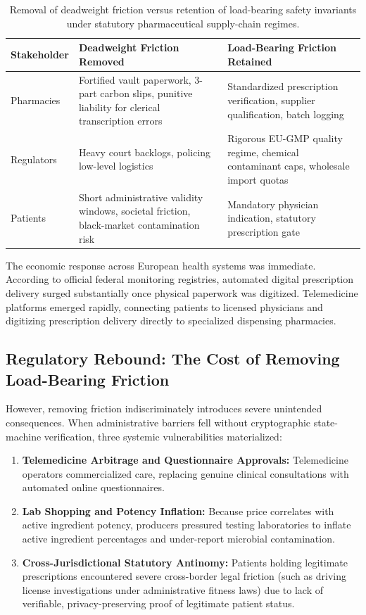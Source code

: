 \documentclass[a4paper,11pt,twoside,parskip=half-,headings=small]{scrartcl}
\begin{document}
\begin{table}[H]
\centering\small
\begin{tabularx}{\linewidth}{@{}l Y Y@{}}
\toprule
\textbf{Stakeholder} & \textbf{Deadweight Friction Removed} & \textbf{Load-Bearing Friction Retained}\\
\midrule
Pharmacies & Fortified vault paperwork, 3-part carbon slips, punitive liability for clerical transcription errors & Standardized prescription verification, supplier qualification, batch logging\\
Regulators & Heavy court backlogs, policing low-level logistics & Rigorous EU-GMP quality regime, chemical contaminant caps, wholesale import quotas\\
Patients & Short administrative validity windows, societal friction, black-market contamination risk & Mandatory physician indication, statutory prescription gate\\
\bottomrule
\end{tabularx}
\caption{Removal of deadweight friction versus retention of load-bearing safety invariants under statutory pharmaceutical supply-chain regimes.}
\label{tab:compliance_friction}
\end{table}

The economic response across European health systems was immediate. According to official federal monitoring registries, automated digital prescription delivery surged substantially once physical paperwork was digitized. Telemedicine platforms emerged rapidly, connecting patients to licensed physicians and digitizing prescription delivery directly to specialized dispensing pharmacies.

\subsection{Regulatory Rebound: The Cost of Removing Load-Bearing Friction}

However, removing friction indiscriminately introduces severe unintended consequences. When administrative barriers fell without cryptographic state-machine verification, three systemic vulnerabilities materialized:
\begin{enumerate}[nosep]
  \item \textbf{Telemedicine Arbitrage and Questionnaire Approvals:} Telemedicine operators commercialized care, replacing genuine clinical consultations with automated online questionnaires.
  \item \textbf{Lab Shopping and Potency Inflation:} Because price correlates with active ingredient potency, producers pressured testing laboratories to inflate active ingredient percentages and under-report microbial contamination.
  \item \textbf{Cross-Jurisdictional Statutory Antinomy:} Patients holding legitimate prescriptions encountered severe cross-border legal friction (such as driving license investigations under administrative fitness laws) due to lack of verifiable, privacy-preserving proof of legitimate patient status.
\end{enumerate}
\end{document}
